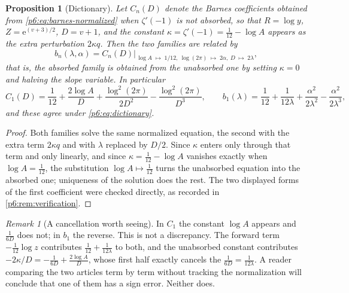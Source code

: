 \documentclass[11pt,a4paper,oneside]{book}
\theoremstyle{plain}
\newtheorem{proposition}[theorem]{Proposition}
\theoremstyle{definition}
\theoremstyle{remark}
\newtheorem{remark}[theorem]{Remark}
\newcommand{\e}{\mathrm{e}}
\begin{document}
\begin{proposition}[Dictionary]\label{p6:prop:dictionary}
Let $C_n(D)$ denote the Barnes coefficients obtained from
\eqref{p6:eq:barnes-normalized} when $\zeta'(-1)$ is \emph{not} absorbed, so
that $R=\log y$, $Z=\e^{(v+3)/2}$, $D=v+1$, and the constant
$\kappa=\zeta'(-1)=\tfrac1{12}-\log A$ appears as the extra perturbation
$2\kappa q$.  Then the two families are related by
\begin{equation}\label{p6:eq:dictionary}
 b_n(\lambda,\alpha)=C_n(D)\Big|_{\,\log A\;\mapsto\;1/12,\
 \log(2\pi)\;\mapsto\;2\alpha,\ D\;\mapsto\;2\lambda},
\end{equation}
that is, the absorbed family is obtained from the unabsorbed one by setting
$\kappa=0$ and halving the slope variable.  In particular
\begin{equation}\label{p6:eq:dictionary-C1}
 C_1(D)=\frac1{12}+\frac{2\log A}{D}
 +\frac{\log^{2}(2\pi)}{2D^{2}}-\frac{\log^{2}(2\pi)}{D^{3}},
 \qquad
 b_1(\lambda)=\frac1{12}+\frac1{12\lambda}
 +\frac{\alpha^{2}}{2\lambda^{2}}-\frac{\alpha^{2}}{2\lambda^{3}},
\end{equation}
and these agree under \eqref{p6:eq:dictionary}.
\end{proposition}

\begin{proof}
Both families solve the same normalized equation, the second with the extra
term $2\kappa q$ and with $\lambda$ replaced by $D/2$.  Since $\kappa$ enters
only through that term and only linearly, and since $\kappa=\tfrac1{12}-\log
A$ vanishes exactly when $\log A=\tfrac1{12}$, the substitution
$\log A\mapsto\tfrac1{12}$ turns the unabsorbed equation into the absorbed
one; uniqueness of the solution does the rest.  The two displayed forms of the
first coefficient were checked directly, as recorded in
\cref{p6:rem:verification}.
\end{proof}

\begin{remark}[A cancellation worth seeing]\label{p6:rem:cancellation}
In $C_1$ the constant $\log A$ appears and $\tfrac1{6D}$ does not; in $b_1$
the reverse.  This is not a discrepancy.  The forward term
$-\tfrac1{12}\log z$ contributes $\tfrac1{12}+\tfrac1{12\lambda}$ to both, and
the unabsorbed constant contributes $-2\kappa/D=-\tfrac1{6D}+\tfrac{2\log A}D$,
whose first half exactly cancels the $\tfrac1{6D}=\tfrac1{12\lambda}$.  A
reader comparing the two articles term by term without tracking the
normalization will conclude that one of them has a sign error.  Neither does.
\end{remark}
\end{document}
